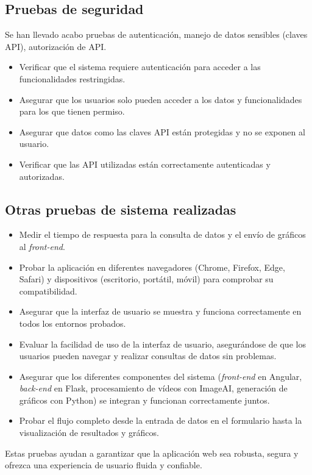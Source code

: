 \subsection{Pruebas de seguridad}
Se han llevado acabo pruebas de autenticación, manejo de datos sensibles (claves API), autorización de API.

\begin{itemize}
    \item Verificar que el sistema requiere autenticación para acceder a las funcionalidades restringidas.
    \item Asegurar que los usuarios solo pueden acceder a los datos y funcionalidades para los que tienen permiso.
    \item Asegurar que datos como las claves API están protegidas y no se exponen al usuario.
    \item Verificar que las API utilizadas están correctamente autenticadas y autorizadas.
\end{itemize}

\subsection{Otras pruebas de sistema realizadas}
\begin{itemize}
    \item Medir el tiempo de respuesta para la consulta de datos y el envío de gráficos al \textit{front-end}.
    \item Probar la aplicación en diferentes navegadores (Chrome, Firefox, Edge, Safari) y dispositivos (escritorio, portátil, móvil) para comprobar su compatibilidad.
    \item Asegurar que la interfaz de usuario se muestra y funciona correctamente en todos los entornos probados.
    \item Evaluar la facilidad de uso de la interfaz de usuario, asegurándose de que los usuarios pueden navegar y realizar consultas de datos sin problemas.
    \item Asegurar que los diferentes componentes del sistema (\textit{front-end} en Angular, \textit{back-end} en Flask, procesamiento de vídeos con ImageAI, generación de gráficos con Python) se integran y funcionan correctamente juntos.
    \item Probar el flujo completo desde la entrada de datos en el formulario hasta la visualización de resultados y gráficos.
\end{itemize}

Estas pruebas ayudan a garantizar que la aplicación web sea robusta, segura y ofrezca una experiencia de usuario fluida y confiable.